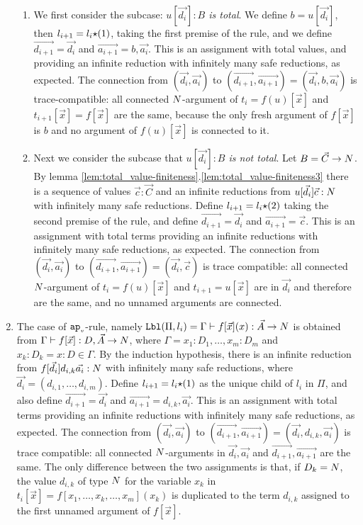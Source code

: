 \documentclass{article}
\newenvironment{proof}[1][Proof]{\begin{trivlist}
\item[\hskip \labelsep {\bfseries #1}]}{\end{trivlist}}
\begin{document}
\begin{proof}
\begin{enumerate}
\begin{enumerate}
\item
  We first consider the subcase: \emph{$u[\vec{d_i}]:B$ is total}.
  We define $b = u[\vec{d_i}]$, then $l_{i+1}=l_i{\star}(1)$, taking the first premise of the rule,
  and we define $\vec{d_{i+1}} = \vec{d_i}$ and $\vec{a_{i+1}} = b,\vec{a_i}$. 
  This is an assignment with total values, and providing an infinite reduction with infinitely many safe
  reductions, as expected. 
  The connection from 
  $(\vec{d_i},\vec{a_i})$ to $(\vec{d_{i+1}},\vec{a_{i+1}}) = (\vec{d_i},b,\vec{a_i})$ is
  trace-compatible: all connected 
  ${N}$-argument of $t_{i}=f(u)[\vec{x}]$ and $t_{i+1}[\vec{x}] = f[\vec{x}]$ are the same,
  because the only fresh argument of $f[\vec{x}]$ 
  is $b$ and no argument of $f(u)[\vec{x}]$ is connected to it.
\item
  Next we consider the subcase that \emph{$u[\vec{d_i}]:B$ is not total}.
  Let $B = \vec{C}\rightarrow{N}$.
  By lemma \ref{lem:total_value-finiteness}.\ref{lem:total_value-finiteness3}
  there is a sequence of values $\vec{c}:\vec{C}$ and an infinite reductions from 
  $u[\vec{d_i}]\vec{c}:{N}$ with infinitely many safe reductions.
  Define $l_{i+1}= l_i {\star} (2)$ taking the second premise of the rule,
  and define $\vec{d_{i+1}} = \vec{d_i}$ and $\vec{a_{i+1}} = \vec{c}$. 
  This is an assignment with total terms providing an infinite reductions with 
  infinitely many safe reductions, as expected.
  The connection from 
  $(\vec{d_i},\vec{a_i})$ to $(\vec{d_{i+1}},\vec{a_{i+1}}) = (\vec{d_i},\vec{c})$ is
  trace compatible: all connected ${N}$-argument of $t_{i}=f(u)[\vec{x}]$ and $t_{i+1}=u[\vec{x}]$ are 
  in $\vec{d_i}$ and therefore are the same, and no unnamed arguments are connected.
 \end{enumerate}



\item
  The case of ${{\tt ap}_{\mbox{\tiny $v$}}}$-rule, namely 
  ${\tt Lbl}(\Pi,l_i) 
  = 
  \Gamma \vdash f[\vec{x}](x): \vec{A}\rightarrow{N}$ is obtained from
  $\Gamma \vdash f[\vec{x}]: D,\vec{A} \rightarrow {N}$,
  where $\Gamma=x_1:D_1,\ldots,x_m:D_m$ and $x_k:D_k = x:D\in\Gamma$. 
  By the induction hypothesis, there is an infinite reduction from $f[\vec{d_i}]d_{i,k}\vec{a_i}:{N}$
  with infinitely many safe reductions,
  where $\vec{d_i} = (d_{i,1},\ldots,d_{i,m})$. 
  Define $l_{i+1}=l_i{\star}(1)$ as the unique child of $l_i$ in $\Pi$, and
  also define $\vec{d_{i+1}} = \vec{d_i}$ and $\vec{a_{i+1}} = d_{i,k},\vec{a_i}$. 
  This is an assignment with total terms providing an infinite reductions with 
  infinitely many safe reductions, as expected.
  The connection from
  $(\vec{d_i},\vec{a_i})$ to
  $(\vec{d_{i+1}},\vec{a_{i+1}}) = (\vec{d_i},d_{i,k},\vec{a_i})$
  is trace compatible: all connected ${N}$-arguments in $\vec{d_i},\vec{a_i}$ and 
  $\vec{d_{i+1}},\vec{a_{i+1}}$ are the same.  
  The only difference between the two assignments
  is that, if $D_k = {N}$, the value $d_{i,k}$ of type ${N}$ for the variable $x_k$
  in $t_i[\vec{x}]=f[x_1,\ldots,x_k,\ldots,x_m](x_k)$ is duplicated to the term $d_{i,k}$ 
  assigned to the first unnamed argument of $ f[\vec{x}]$. 



\end{enumerate}
\end{proof}
\end{document}
